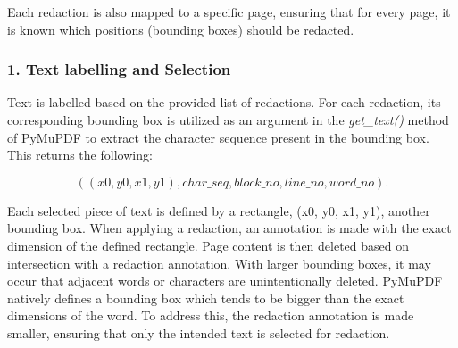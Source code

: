 Each redaction is also mapped to a specific page, ensuring that for every page, it is known which positions (bounding boxes) should be redacted.

\subsubsection{1. Text labelling and Selection}
Text is labelled based on the provided list of redactions. For each redaction, its corresponding bounding box is utilized as an argument in the \textit{get\_text()} method of PyMuPDF to extract the character sequence present in the bounding box. This returns the following:

\[((x0, y0, x1, y1), char\_seq, block\_no, line\_no, word\_no).\]

Each selected piece of text is defined by a rectangle, (x0, y0, x1, y1), another bounding box. When applying a redaction, an annotation is made with the exact dimension of the defined rectangle. Page content is then deleted based on intersection with a redaction annotation. With larger bounding boxes, it may occur that adjacent words or characters are unintentionally deleted. PyMuPDF natively defines a bounding box which tends to be bigger than the exact dimensions of the word. To address this, the redaction annotation is made smaller, ensuring that only the intended text is selected for redaction. 
